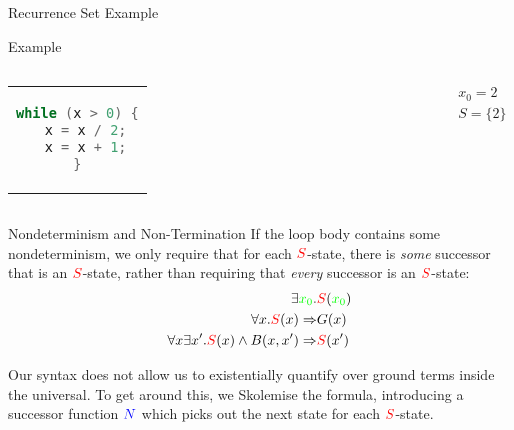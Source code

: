 \documentclass[xcolor=pdftex,t,11pt]{beamer}
\newcommand{\red}[1]{\textcolor{red}{#1}}
\newcommand{\blue}[1]{\textcolor{blue}{#1}}
\newcommand{\green}[1]{\textcolor{green}{#1}}
\begin{document}
\begin{frame}[fragile]{Recurrence Set Example}
\begin{exampleblock}{Example}
\begin{center}
\begin{columns}[c]
  \begin{tabular}{c}
   \begin{lstlisting}[language=c,basicstyle=\normalsize]
while (x > 0) {
  x = x / 2;
  x = x + 1;
}
   \end{lstlisting}
  \end{tabular}
 \begin{gather*}
  x_0 = 2 \\
  S = \{ 2 \}
 \end{gather*}
\end{columns}
\end{center}
\end{exampleblock}
\end{frame}

\begin{frame}[fragile]{Nondeterminism and Non-Termination}
 If the loop body contains some nondeterminism, we only require that for each $\red{S}$-state, there is
 \emph{some} successor that is an $\red{S}$-state, rather than requiring that \emph{every} successor is an
 $\red{S}$-state:
  \begin{align*}
  \exists \green{x_0} . & \red{S}(\green{x_0}) \\
  \forall x . \red{S}(x) \Rightarrow & G(x) \\
  \forall x \exists x' . \red{S}(x) \wedge B(x, x') \Rightarrow & \red{S}(x')
 \end{align*}

 \vspace{1em}
 
 \pause
 
Our syntax does not allow us to existentially quantify over ground terms inside the universal.  To
get around this, we Skolemise the formula, introducing a successor function $\blue{N}$ which picks
out the next state for each $\red{S}$-state.
\end{frame}
\end{document}
